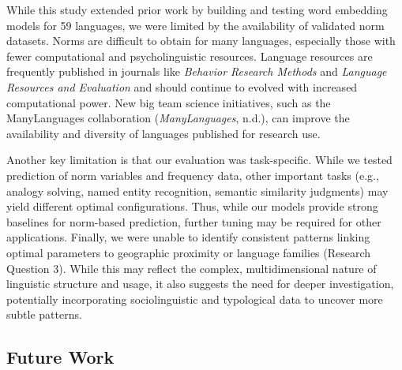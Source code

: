\documentclass[
  man,floatsintext]{apa6}
\begin{document}
While this study extended prior work by building and testing word embedding models for 59 languages, we were limited by the availability of validated norm datasets. Norms are difficult to obtain for many languages, especially those with fewer computational and psycholinguistic resources. Language resources are frequently published in journals like \emph{Behavior Research Methods} and \emph{Language Resources and Evaluation} and should continue to evolved with increased computational power. New big team science initiatives, such as the ManyLanguages collaboration (\emph{ManyLanguages}, n.d.), can improve the availability and diversity of languages published for research use.

Another key limitation is that our evaluation was task-specific. While we tested prediction of norm variables and frequency data, other important tasks (e.g., analogy solving, named entity recognition, semantic similarity judgments) may yield different optimal configurations. Thus, while our models provide strong baselines for norm-based prediction, further tuning may be required for other applications. Finally, we were unable to identify consistent patterns linking optimal parameters to geographic proximity or language families (Research Question 3). While this may reflect the complex, multidimensional nature of linguistic structure and usage, it also suggests the need for deeper investigation, potentially incorporating sociolinguistic and typological data to uncover more subtle patterns.

\subsection{Future Work}\label{future-work}
\end{document}
